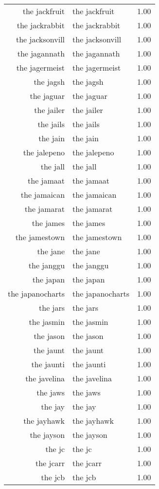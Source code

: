 \begin{table}[ht]
\begin{tabular}{rlr}
  the jackfruit & the jackfruit & 1.00 \\ 
  the jackrabbit & the jackrabbit & 1.00 \\ 
  the jacksonvill & the jacksonvill & 1.00 \\ 
  the jagannath & the jagannath & 1.00 \\ 
  the jagermeist & the jagermeist & 1.00 \\ 
  the jagsh & the jagsh & 1.00 \\ 
  the jaguar & the jaguar & 1.00 \\ 
  the jailer & the jailer & 1.00 \\ 
  the jails & the jails & 1.00 \\ 
  the jain & the jain & 1.00 \\ 
  the jalepeno & the jalepeno & 1.00 \\ 
  the jall & the jall & 1.00 \\ 
  the jamaat & the jamaat & 1.00 \\ 
  the jamaican & the jamaican & 1.00 \\ 
  the jamarat & the jamarat & 1.00 \\ 
  the james & the james & 1.00 \\ 
  the jamestown & the jamestown & 1.00 \\ 
  the jane & the jane & 1.00 \\ 
  the janggu & the janggu & 1.00 \\ 
  the japan & the japan & 1.00 \\ 
  the japanocharts & the japanocharts & 1.00 \\ 
  the jars & the jars & 1.00 \\ 
  the jasmin & the jasmin & 1.00 \\ 
  the jason & the jason & 1.00 \\ 
  the jaunt & the jaunt & 1.00 \\ 
  the jaunti & the jaunti & 1.00 \\ 
  the javelina & the javelina & 1.00 \\ 
  the jaws & the jaws & 1.00 \\ 
  the jay & the jay & 1.00 \\ 
  the jayhawk & the jayhawk & 1.00 \\ 
  the jayson & the jayson & 1.00 \\ 
  the jc & the jc & 1.00 \\ 
  the jcarr & the jcarr & 1.00 \\ 
  the jcb & the jcb & 1.00 \\ 

\end{tabular}
\end{table}
